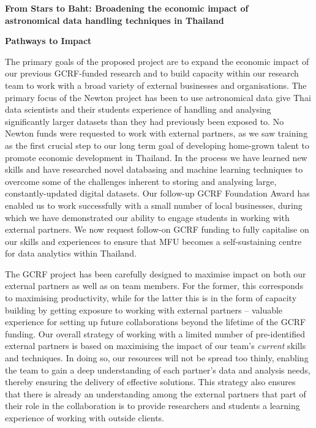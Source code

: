 \documentclass[11pt]{article}
\begin{document}
  \setcounter{figure}{0}
  \noindent
  {\LARGE \bf From Stars to Baht: Broadening the economic impact of \\
  astronomical data handling techniques in Thailand}
  
  \vspace{3mm}
  \noindent
  {\LARGE \bf Pathways to Impact}
  
  \vspace{3mm}
  \noindent
  The primary goals of the proposed project are to expand the economic impact of our previous GCRF-funded research and to build capacity within our research team to work with a broad variety of external businesses and organisations. The primary focus of the Newton project has been to use astronomical data give Thai data scientists and their students experience of handling and analysing significantly larger datasets than they had previously been exposed to. No Newton funds were requested to work with external partners, as we saw training as the first crucial step to our long term goal of developing home-grown talent to promote economic development in Thailand. In the process we have learned new skills and have researched novel databasing and machine learning techniques to overcome some of the challenges inherent to storing and analysing large, constantly-updated digital datasets. Our follow-up GCRF Foundation Award has enabled us to work successfully with a small number of local businesses, during which we have demonstrated our ability to engage students in working with external partners. We now request follow-on GCRF funding to fully capitalise on our skills and experiences to ensure that MFU becomes a self-sustaining centre for data analytics within Thailand.  
  
  \vspace{2mm}
  \noindent
  The GCRF project has been carefully designed to maximise impact on both our external partners as well as on team members. For the former, this corresponds to maximising productivity, while for the latter this is in the form of capacity building by getting exposure to working with external partners -- valuable experience for setting up future collaborations beyond the lifetime of the GCRF funding. Our overall strategy of working with a limited number of pre-identified external partners is based on maximising the impact of our team's {\it current} skills and techniques. In doing so, our resources will not be spread too thinly, enabling the team to gain a deep understanding of each partner's data and analysis needs, thereby ensuring the delivery of effective solutions. This strategy also ensures that there is already an understanding among the external partners that part of their role in the collaboration is to provide researchers and students a learning experience of working with outside clients.
  
\end{document}
